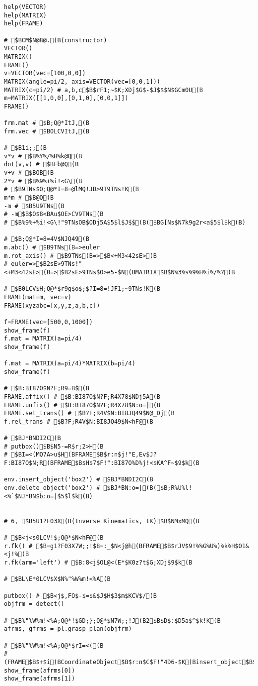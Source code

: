 \documentclass[11pt]{jreport}
\begin{document}
{{{{{{{{{{{{\begin{verbatim}
help(VECTOR)
help(MATRIX)
help(FRAME)

# $BCM$N@8@.(B(constructor)
VECTOR()
MATRIX()
FRAME()
v=VECTOR(vec=[100,0,0])
MATRIX(angle=pi/2, axis=VECTOR(vec=[0,0,1]))
MATRIX(c=pi/2) # a,b,c$B$rF1;~$K;XDj$G$-$J$$$N$GCm0U(B
m=MATRIX([[1,0,0],[0,1,0],[0,0,1]])
FRAME()

frm.mat # $B;Q@*ItJ,(B
frm.vec # $B0LCVItJ,(B

# $B1i;;(B
v*v # $B%Y%/%H%k@Q(B
dot(v,v) # $BFb@Q(B
v+v # $BOB(B
2*v # $B%9%+%i!<G\(B
# $B9TNs$O;Q@*I=8=@lMQ!JD>9T9TNs!K(B
m*m # $B@Q(B
-m # $B5U9TNs(B
# -m$B$O$8<BAu$OE>CV9TNs(B
# $B%9%+%i!<G\!"9TNsOB$ODj5A$5$l$J$$(B($BG[Ns$N7k9g2r<a$5$l$k(B)

# $B;Q@*I=8=4V$NJQ49(B
m.abc() # $B9TNs(B=>euler
m.rot_axis() # $B9TNs(B=>$B<+M3<42sE>(B
# euler=>$B2sE>9TNs!"<+M3<42sE>(B=>$B2sE>9TNs$O>e5-$N(BMATRIX$B$N%3%s%9%H%i%/%?(B

# $B0LCV$H;Q@*$r9g$o$;$?I=8=!JF1;~9TNs!K(B
FRAME(mat=m, vec=v)
FRAME(xyzabc=[x,y,z,a,b,c])

f=FRAME(vec=[500,0,1000])
show_frame(f)
f.mat = MATRIX(a=pi/4)
show_frame(f)

f.mat = MATRIX(a=pi/4)*MATRIX(b=pi/4)
show_frame(f)

# $B:BI87O$N?F;R9=B$(B
FRAME.affix() # $B:BI87O$N?F;R4X78$NDj5A(B
FRAME.unfix() # $B:BI87O$N?F;R4X78$N:o=|(B
FRAME.set_trans() # $B?F;R4V$N:BI8JQ49$N@_Dj(B
f.rel_trans # $B?F;R4V$N:BI8JQ49$N<hF@(B

# $BJ*BNDI2C(B
# putbox()$B$N5-=R$r;2>H(B
# $BI=<(MQ7A>u$H(BFRAME$B$r:n$j!"E,Ev$J?F:BI87O$N;R(BFRAME$B$H$7$F!":BI87O%D%j!<$KA^F~$9$k(B

env.insert_object('box2') # $BJ*BNDI2C(B
env.delete_object('box2') # $BJ*BN:o=|(B($B;R%U%l!<%`$NJ*BN$b:o=|$5$l$k(B)


# 6, $B5U1?F03X(B(Inverse Kinematics, IK)$B$NMxMQ(B

# $B<j<s0LCV!$;Q@*$N<hF@(B
r.fk() # $B=g1?F03X7W;;!$8=:_$N<j@h(BFRAME$B$rJV$9!%%G%U%)%k%H$O1&<j!%(B
r.fk(arm='left') # $B:8<j$OL@<(E*$K0z?t$G;XDj$9$k(B

# $BL\E*0LCV$X$N%"%W%m!<%A(B

putbox() # $B<j$,FO$-$=$&$J$H$3$m$KCV$/(B
objfrm = detect()

# $B%"%W%m!<%A;Q@*!$GD;};Q@*$N7W;;!J(B2$B$D$:$D5a$^$k!K(B
afrms, gfrms = pl.grasp_plan(objfrm)

# $B%"%W%m!<%A;Q@*$rI=<((B
# (FRAME$B$+$i(BCoordinateObject$B$r:n$C$F!"4D6-$K(Binsert_object$B$9$k(B)
show_frame(afrms[0])
show_frame(afrms[1])


\end{verbatim}}}}}}}}}}}}}
\end{document}
